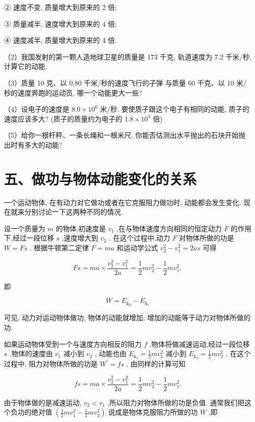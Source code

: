 \documentclass[10pt]{article}
\begin{document}
② 速度不变, 质量增大到原来的 2 倍;

③ 质量减半, 速度增大到原来的 4 倍;

④ 速度减半, 质量增大到原来的 4 倍.

（2）我国发射的第一颗人造地球卫星的质量是 173 千克, 轨道速度为 7.2 千米/秒, 计算它的动能.

（3）质量 10 克、以 0.80 千米/秒的速度飞行的子弹 与质量 60 千克、以 10 米/秒的速度奔跑的运动员, 哪一个动能更大一些?

（4）设电子的速度是 \({8.0} \times {10}^{6}\) 米/秒. 要使质子跟这个电子有相同的动能, 质子的速度应该多大? (质子的质量约为电子的 \({1.8} \times {10}^{3}\) 倍)

（5）给你一根杆秤、一条长绳和一根米尺, 你能否估测出水平抛出的石块开始抛出时有多大的动能?

\section*{五、做功与物体动能变化的关系}

一个运动物体, 在有动力对它做功或者在它克服阻力做功时, 动能都会发生变化. 现在就来分别讨论一下这两种不同的情况.

设一个质量为 \(m\) 的物体,初速度是 \({v}_{1}\) ,在与物体速度方向相同的恒定动力 \(F\) 的作用下,经过一段位移 \(s\) ,速度增大到 \({v}_{2}\) . 在这个过程中,动力 \(F\) 对物体所做的功是 \(W = {Fs}\) . 根据牛顿第二定律 \(F = {ma}\) 和运动学公式 \({v}_{2}^{2} - {v}_{1}^{2} = {2as}\) 可得

\[
{Fs} = {ma} \times \frac{{v}_{2}^{2} - {v}_{1}^{2}}{2a} = \frac{1}{2}m{v}_{2}^{2} - \frac{1}{2}m{v}_{1}^{2},
\]

即

\[
W = {E}_{{\mathrm{k}}_{2}} - {E}_{{\mathrm{k}}_{1}}
\]

可见, 动力对运动物体做功, 物体的动能就增加; 增加的动能等于动力对物体所做的功.

如果运动物体受到一个与速度方向相反的阻力 \(f\) ,物体将做减速运动,经过一段位移 \(s\) ,物体的速度由 \({v}_{1}\) 减小到 \({v}_{2}\) , 动能也由 \({E}_{{\mathrm{k}}_{1}} = \frac{1}{2}m{v}_{1}^{2}\) 减小到 \({E}_{{\mathrm{k}}_{2}} = \frac{1}{2}m{v}_{2}^{2}\) . 在这个过程中, 阻力对物体所做的功是 \({W}^{\prime } = {fs}\) . 由同样的计算可知

\[
{fs} = {ma} \times \frac{{v}_{2}^{2} - {v}_{1}^{2}}{2a} = \frac{1}{2}m{v}_{2}^{2} - \frac{1}{2}m{v}_{1}^{2}.
\]

由于物体做的是减速运动, \({v}_{2} < {v}_{1}\) ,所以阻力对物体所做的功是负值. 通常我们把这个负功的绝对值 \(\left( {\frac{1}{2}m{v}_{1}^{2} - \frac{1}{2}m{v}_{2}^{2}}\right)\) 说成是物体克服阻力所做的功 \(W\) ,即
\end{document}
